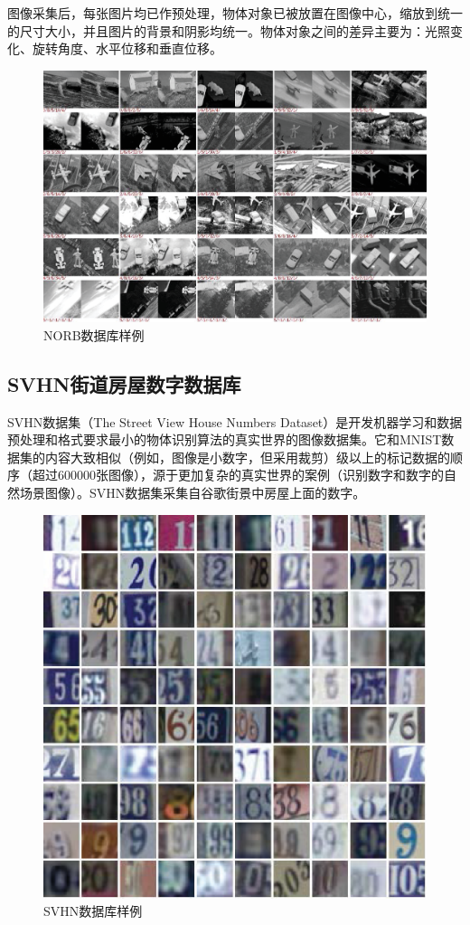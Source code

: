 \documentclass[oneside]{ZJUthesis}
\begin{document}
图像采集后，每张图片均已作预处理，物体对象已被放置在图像中心，缩放到统一的尺寸大小，并且图片的背景和阴影均统一。物体对象之间的差异主要为：光照变化、旋转角度、水平位移和垂直位移。
\begin{figure}[H]
\centering
\includegraphics[scale=0.5]{./Pictures/norb-icon.eps}
\caption{NORB数据库样例\label{fig:norb-icon}}
\end{figure}

\subsection{SVHN街道房屋数字数据库}
SVHN数据集（The Street View House Numbers Dataset）是开发机器学习和数据预处理和格式要求最小的物体识别算法的真实世界的图像数据集\cite{netzer2011reading}。它和MNIST数据集的内容大致相似（例如，图像是小数字，但采用裁剪）级以上的标记数据的顺序（超过600000张图像），源于更加复杂的真实世界的案例（识别数字和数字的自然场景图像）。SVHN数据集采集自谷歌街景中房屋上面的数字。
\begin{figure}[H]
\centering
\includegraphics[scale=0.5]{./Pictures/svhn-icon.eps}
\caption{SVHN数据库样例\label{fig:svhn-icon}}
\end{figure}
\end{document}
